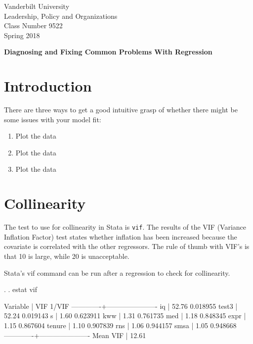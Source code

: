 \documentclass[12pt]{article}
\begin{document}
\thispagestyle{empty}%


\setlength{\parskip}{1ex plus 0.5ex minus 0.2ex}

\setcounter{secnumdepth}{-2}



\begin{flushleft}
Vanderbilt University\\Leadership, Policy and Organizations\\Class Number 9522\\ Spring 2018\\
\end{flushleft}

\begin{center}
\textbf{Diagnosing and Fixing Common Problems With Regression}
\end{center}

\section{Introduction}
\label{sec:introduction}

There are three ways to get a good intuitive grasp of whether there
might be some issues with your model fit:

\begin{enumerate}
\item Plot the data

\item Plot the data

\item Plot the data
\end{enumerate}


\section{Collinearity}
\label{sec:collinearity}

The test to use for collinearity in Stata is \texttt{vif}. The results
of the VIF (Variance Inflation Factor) test states whether inflation
has been increased because the covariate is correlated with the other
regressors. The rule of thumb with VIF's is that 10 is large, while 20
is unacceptable.

Stata's vif command can be run after a regression to check for
collinearity. 

\begin{stlog}
  
. 
. estat vif

    Variable |       VIF       1/VIF  
-------------+----------------------
          iq |     52.76    0.018955
       test3 |     52.24    0.019143
           s |      1.60    0.623911
         kww |      1.31    0.761735
         med |      1.18    0.848345
        expr |      1.15    0.867604
      tenure |      1.10    0.907839
         rns |      1.06    0.944157
        smsa |      1.05    0.948668
-------------+----------------------
    Mean VIF |     12.61

\end{stlog}
\end{document}
